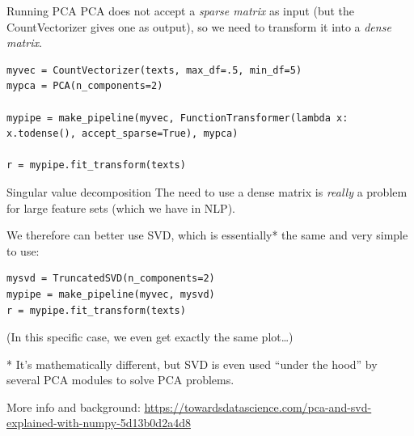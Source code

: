 \documentclass[compress]{beamer}
\begin{document}
\begin{frame}{Running PCA}
PCA does not accept a \textit{sparse matrix} as input (but the CountVectorizer gives one as output), so we need to transform it into a \textit{dense matrix}.

\begin{lstlisting}
myvec = CountVectorizer(texts, max_df=.5, min_df=5)
mypca = PCA(n_components=2)

mypipe = make_pipeline(myvec, FunctionTransformer(lambda x: x.todense(), accept_sparse=True), mypca)

r = mypipe.fit_transform(texts)
\end{lstlisting}
\end{frame}









\begin{frame}[fragile]{Singular value decomposition}
The need to use a dense matrix is \emph{really} a problem for large feature sets (which we have in NLP).
\pause

We therefore can better use SVD, which is essentially* the same and very simple to use:

\begin{lstlisting}
mysvd = TruncatedSVD(n_components=2)
mypipe = make_pipeline(myvec, mysvd)
r = mypipe.fit_transform(texts)
\end{lstlisting}

\footnotesize{(In this specific case, we even get exactly the same plot\ldots)}


\footnotesize{
* It's mathematically different, but SVD is even used ``under the hood'' by several PCA modules to solve PCA problems.

More info and background: \url{https://towardsdatascience.com/pca-and-svd-explained-with-numpy-5d13b0d2a4d8}}

\end{frame}
\end{document}
